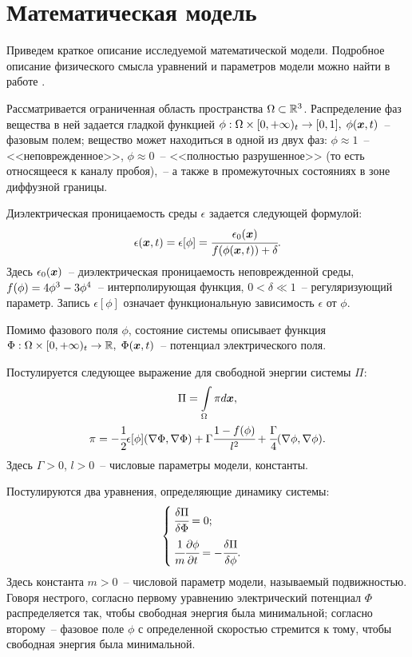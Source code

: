 
\section{Математическая модель}

Приведем краткое описание исследуемой математической модели. По\forcehyphenation дробное описание физического смысла уравнений и параметров модели можно найти в работе \cite{ponomarev_stability}.

Рассматривается ограниченная область пространства $\Omega \subset {\mathbb{R}}^3$. Распределение фаз вещества в ней задается гладкой функцией $\phi: \Omega \times [0, +\infty)_t \hm \to [0, 1], \; \phi(\vx, t)$~-- фазовым полем; вещество может находиться в одной из двух фаз: $\phi \approx 1$~-- <<неповрежденное>>, $\phi \approx 0$~-- <<полностью разрушенное>> (то есть относящееся к каналу пробоя),~-- а также в промежуточных состояниях в зоне диффузной границы.

Диэлектрическая проницаемость среды $\epsilon$ задается следующей формулой:
\[
	\epsilon({\boldsymbol{x}}, t) = \epsilon[\phi] = \cfrac{\epsilon_0({\boldsymbol{x}})}{f(\phi({\boldsymbol{x}}, t)) + \delta}.
\]
Здесь $\epsilon_0({\boldsymbol{x}})$~-- диэлектрическая проницаемость неповрежденной среды, $f(\phi) \hm = 4\phi^3 - 3\phi^4$~-- интерполирующая функция, $0 < \delta \ll 1$~-- регуляризующий параметр. Запись $\epsilon[\phi]$ означает функциональную зависимость $\epsilon$ от $\phi$.

Помимо фазового поля $\phi$, состояние системы описывает функция $\Phi: \Omega \hm \times [0, +\infty)_t \to \Real, \; \Phi(\vx, t)$~-- потенциал электрического поля.

Постулируется следующее выражение для свободной энергии системы $\Pi$:
\begin{gather*}
	\Pi = \int \limits_\Omega \pi d {\boldsymbol{x}}, \\
	\pi = -\cfrac{1}{2} \epsilon[\phi] (\nabla \Phi, \nabla \Phi) + \Gamma \cfrac{1 - f(\phi)}{l^2} + \cfrac{\Gamma}{4} (\nabla \phi, \nabla \phi).
\end{gather*}
Здесь $\Gamma > 0$, $l > 0$~-- числовые параметры модели, константы.

Постулируются два уравнения, определяющие динамику системы:
\begin{equation*}
\begin{cases}
	\cfrac{\delta \Pi}{\delta \Phi} = 0; \\[3mm]
	\cfrac{1}{m} \cfrac{\partial \phi}{\partial t} = -\cfrac{\delta \Pi}{\delta \phi}.
\end{cases}
\end{equation*}
Здесь константа $m > 0$~-- числовой параметр модели, называемый подвижностью. Говоря нестрого, согласно первому уравнению электрический потенциал $\Phi$ распределяется так, чтобы свободная энергия была минимальной; согласно второму~-- фазовое поле $\phi$ с определенной скоростью стремится к тому, чтобы свободная энергия была минимальной.

